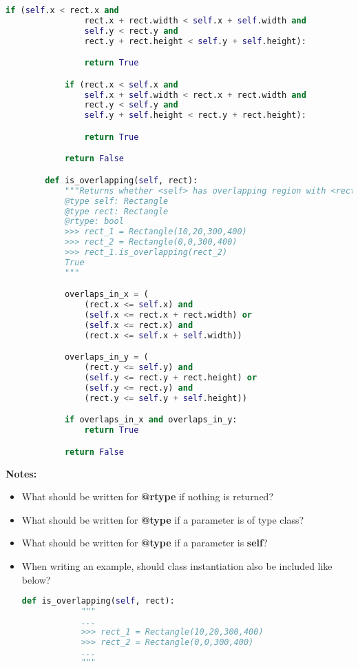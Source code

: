 \documentclass[12pt]{article}
\begin{document}
\begin{enumerate}
\begin{lstlisting}[language=Python]
            if (self.x < rect.x and
                rect.x + rect.width < self.x + self.width and
                self.y < rect.y and
                rect.y + rect.height < self.y + self.height):

                return True

            if (rect.x < self.x and
                self.x + self.width < rect.x + rect.width and
                rect.y < self.y and
                self.y + self.height < rect.y + rect.height):

                return True

            return False

        def is_overlapping(self, rect):
            """Returns whether <self> has overlapping region with <rect>
            @type self: Rectangle
            @type rect: Rectangle
            @rtype: bool
            >>> rect_1 = Rectangle(10,20,300,400)
            >>> rect_2 = Rectangle(0,0,300,400)
            >>> rect_1.is_overlapping(rect_2)
            True
            """

            overlaps_in_x = (
                (rect.x <= self.x) and
                (self.x <= rect.x + rect.width) or
                (self.x <= rect.x) and
                (rect.x <= self.x + self.width))

            overlaps_in_y = (
                (rect.y <= self.y) and
                (self.y <= rect.y + rect.height) or
                (self.y <= rect.y) and
                (rect.y <= self.y + self.height))

            if overlaps_in_x and overlaps_in_y:
                return True

            return False

    \end{lstlisting}

    \bigskip

    \textbf{Notes:}

    \begin{itemize}
    \item What should be written for \textbf{@rtype} if nothing is returned?
    \item What should be written for \textbf{@type} if a parameter is of type class?
    \item What should be written for \textbf{@type} if a parameter is \textbf{self}?
    \item When writing an example, should class instantiation also be included like below?

    \begin{lstlisting}[language=Python]
        def is_overlapping(self, rect):
            """
            ...
            >>> rect_1 = Rectangle(10,20,300,400)
            >>> rect_2 = Rectangle(0,0,300,400)
            ...
            """
    \end{lstlisting}
    \end{itemize}
\end{enumerate}
\end{document}
